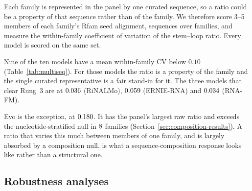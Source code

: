 \documentclass[11pt]{article}
\begin{document}
Each family is represented in the panel by one curated sequence, so a ratio
could be a property of that sequence rather than of the family. We therefore
score 3--5 members of each family's Rfam seed alignment, \multiseqN{} sequences
over \multiseqFamilies{} families, and measure the within-family coefficient of
variation of the stem--loop ratio. Every model is scored on the same set.



Nine of the ten models have a mean within-family CV below $0.10$
(Table~\ref{tab:multiseq}). For those models the ratio is a property of the
family and the single curated representative is a fair stand-in for it. The
three models that clear Rung~3 are at $0.036{}$ (RiNALMo),
$0.059{}$ (ERNIE-RNA) and $0.034{}$ (RNA-FM).

Evo is the exception, at $0.180{}$. It has the panel's largest raw ratio and
exceeds the nucleotide-stratified null in $8{}$ families
(Section~\ref{sec:composition-results}). A ratio that varies this much between
members of one family, and is largely absorbed by a composition null, is
what a sequence-composition response looks like rather than a structural one.

\subsection{Robustness analyses}
\label{sec:robustness}
\end{document}
